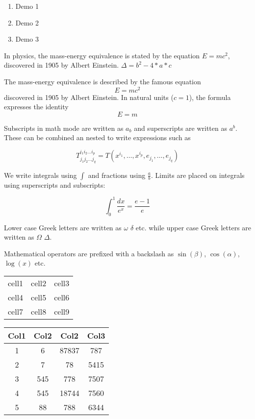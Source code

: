 \documentclass[12pt]{article}
\begin{document}
\begin{enumerate}
    \item Demo 1
    \item Demo 2
    \item Demo 3
\end{enumerate}


In physics, the mass-energy equivalence is stated 
by the equation $E=mc^2$, discovered in 1905 by Albert Einstein.\newline
$\Delta = b^2 - 4*a*c$


The mass-energy equivalence is described by the famous equation
\[ E=mc^2 \]
discovered in 1905 by Albert Einstein. 
In natural units ($c = 1$), the formula expresses the identity
\begin{equation}
E=m
\end{equation}

Subscripts in math mode are written as $a_b$ and superscripts are written as $a^b$. These can be combined an nested to write expressions such as

\[ T^{i_1 i_2 \dots i_p}_{j_1 j_2 \dots j_q} = T(x^{i_1},\dots,x^{i_p},e_{j_1},\dots,e_{j_q}) \]
 
We write integrals using $\int$ and fractions using $\frac{a}{b}$. Limits are placed on integrals using superscripts and subscripts:

\[ \int_0^1 \frac{dx}{e^x} =  \frac{e-1}{e} \]

Lower case Greek letters are written as $\omega$ $\delta$ etc. while upper case Greek letters are written as $\Omega$ $\Delta$.

Mathematical operators are prefixed with a backslash as $\sin(\beta)$, $\cos(\alpha)$, $\log(x)$ etc.

\begin{center}
    \begin{tabular}{|c |c |c|}
        \hline
        cell1 & cell2 & cell3 \\ 
        cell4 & cell5 & cell6 \\  
        cell7 & cell8 & cell9 \\
        \hline
    \end{tabular}
\end{center}

\begin{center}
 \begin{tabular}{|c c c c|} 
 \hline
 Col1 & Col2 & Col2 & Col3 \\ [0.5ex] 
 \hline\hline
 1 & 6 & 87837 & 787 \\ 
 \hline
 2 & 7 & 78 & 5415 \\
 \hline
 3 & 545 & 778 & 7507 \\
 \hline
 4 & 545 & 18744 & 7560 \\
 \hline
 5 & 88 & 788 & 6344 \\ [1ex] 
 \hline
\end{tabular}
\end{center}
\end{document}

